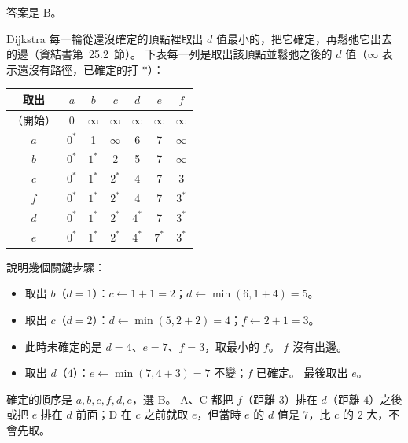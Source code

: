 \begin{pastsoln}
答案是 B。

Dijkstra 每一輪從還沒確定的頂點裡取出 $d$ 值最小的，把它確定，再鬆弛它出去的邊（資結書第~25.2~節）。
下表每一列是取出該頂點並鬆弛之後的 $d$ 值（$\infty$ 表示還沒有路徑，已確定的打 $*$）：
\begin{center}
\begin{tabular}{ccccccc}
\toprule
取出 & $a$ & $b$ & $c$ & $d$ & $e$ & $f$ \\
\midrule
（開始） & 0 & $\infty$ & $\infty$ & $\infty$ & $\infty$ & $\infty$ \\
$a$ & $0^*$ & 1 & $\infty$ & 6 & 7 & $\infty$ \\
$b$ & $0^*$ & $1^*$ & 2 & 5 & 7 & $\infty$ \\
$c$ & $0^*$ & $1^*$ & $2^*$ & 4 & 7 & 3 \\
$f$ & $0^*$ & $1^*$ & $2^*$ & 4 & 7 & $3^*$ \\
$d$ & $0^*$ & $1^*$ & $2^*$ & $4^*$ & 7 & $3^*$ \\
$e$ & $0^*$ & $1^*$ & $2^*$ & $4^*$ & $7^*$ & $3^*$ \\
\bottomrule
\end{tabular}
\end{center}
說明幾個關鍵步驟：
\begin{itemize}
\item 取出 $b$（$d = 1$）：$c \gets 1 + 1 = 2$；$d \gets \min(6, 1 + 4) = 5$。
\item 取出 $c$（$d = 2$）：$d \gets \min(5, 2 + 2) = 4$；$f \gets 2 + 1 = 3$。
\item 此時未確定的是 $d = 4$、$e = 7$、$f = 3$，取最小的 $f$。 $f$ 沒有出邊。
\item 取出 $d$（$4$）：$e \gets \min(7, 4 + 3) = 7$ 不變；$f$ 已確定。 最後取出 $e$。
\end{itemize}
確定的順序是 $a, b, c, f, d, e$，選 B。 A、C 都把 $f$（距離 $3$）排在 $d$（距離 $4$）之後或把 $e$ 排在
$d$ 前面；D 在 $c$ 之前就取 $e$，但當時 $e$ 的 $d$ 值是 $7$，比 $c$ 的 $2$ 大，不會先取。
\end{pastsoln}
